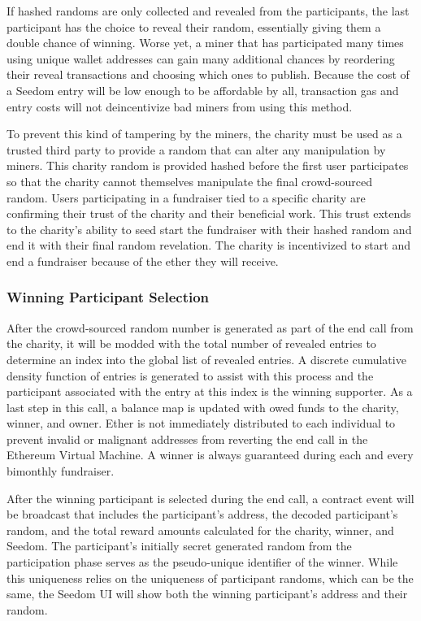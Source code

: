 \documentclass[11pt]{article}
\begin{document}
If hashed randoms are only collected and revealed from the participants, the last participant has the choice to reveal their random, essentially giving them a double chance of winning. Worse yet, a miner that has participated many times using unique wallet addresses can gain many additional chances by reordering their reveal transactions and choosing which ones to publish. Because the cost of a Seedom entry will be low enough to be affordable by all, transaction gas and entry costs will not deincentivize bad miners from using this method.

To prevent this kind of tampering by the miners, the charity must be used as a trusted third party to provide a random that can alter any manipulation by miners. This charity random is provided hashed before the first user participates so that the charity cannot themselves manipulate the final crowd-sourced random. Users participating in a fundraiser tied to a specific charity are confirming their trust of the charity and their beneficial work. This trust extends to the charity's ability to seed start the fundraiser with their hashed random and end it with their final random revelation. The charity is incentivized to start and end a fundraiser because of the ether they will receive.

\subsubsection{Winning Participant Selection}

After the crowd-sourced random number is generated as part of the end call from the charity, it will be modded with the total number of revealed entries to determine an index into the global list of revealed entries. A discrete cumulative density function of entries is generated to assist with this process and the participant associated with the entry at this index is the winning supporter. As a last step in this call, a balance map is updated with owed funds to the charity, winner, and owner. Ether is not immediately distributed to each individual to prevent invalid or malignant addresses from reverting the end call in the Ethereum Virtual Machine. A winner is always guaranteed during each and every bimonthly fundraiser.

After the winning participant is selected during the end call, a contract event will be broadcast that includes the participant's address, the decoded participant's random, and the total reward amounts calculated for the charity, winner, and Seedom. The participant's initially secret generated random from the participation phase serves as the pseudo-unique identifier of the winner. While this uniqueness relies on the uniqueness of participant randoms, which can be the same, the Seedom UI will show both the winning participant's address and their random.
\end{document}
